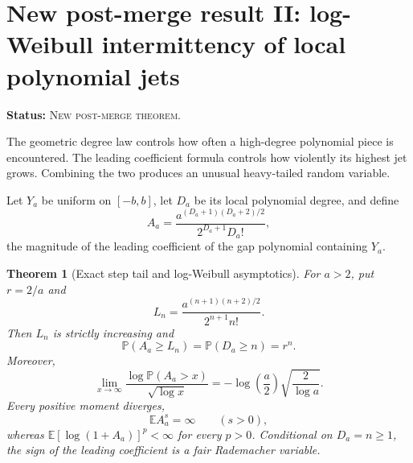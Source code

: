 \documentclass[11pt,oneside]{article}
\newtheorem{theorem}{Theorem}[section]
\theoremstyle{definition}
\theoremstyle{remark}
\newcommand{\E}{\mathbb{E}}
\newcommand{\Prob}{\mathbb{P}}
\newcommand{\DerivedStatus}{\textcolor{DerivedPurple}{\textsc{New post-merge theorem}}}
\newcommand{\status}[1]{\par\smallskip\noindent\textbf{Status:} #1.\par\smallskip}
\begin{document}
\section{New post-merge result II: log-Weibull intermittency of local polynomial jets}
\label{sec:jet-intermittency}
\status{\DerivedStatus}

The geometric degree law controls how often a high-degree polynomial piece is encountered.
The leading coefficient formula controls how violently its highest jet grows.  Combining the
two produces an unusual heavy-tailed random variable.

Let \(Y_a\) be uniform on \([-b,b]\), let \(D_a\) be its local polynomial degree, and define
\begin{equation}
 A_a=\frac{a^{(D_a+1)(D_a+2)/2}}{2^{D_a+1}D_a!},
 \label{eq:random-leading-amplitude}
\end{equation}
the magnitude of the leading coefficient of the gap polynomial containing \(Y_a\).

\begin{theorem}[Exact step tail and log-Weibull asymptotics]
\label{thm:jet-heavy-tail}
For \(a>2\), put \(r=2/a\) and
\[
 L_n=\frac{a^{(n+1)(n+2)/2}}{2^{n+1}n!}.
\]
Then \(L_n\) is strictly increasing and
\begin{equation}
  \Prob(A_a\ge L_n)=\Prob(D_a\ge n)=r^n.
  \label{eq:jet-exact-tail}
\end{equation}
Moreover,
\begin{equation}
 \lim_{x\to\infty}
 \frac{\log\Prob(A_a>x)}{\sqrt{\log x}}
 =-\log\!\left(\frac a2\right)\sqrt{\frac{2}{\log a}}.
 \label{eq:jet-log-weibull-tail}
\end{equation}
Every positive moment diverges,
\begin{equation}
  \E A_a^s=\infty\qquad(s>0),
  \label{eq:jet-infinite-moments}
\end{equation}
whereas \(\E[\log(1+A_a)]^p<\infty\) for every \(p>0\).  Conditional on \(D_a=n\ge1\),
the sign of the leading coefficient is a fair Rademacher variable.
\end{theorem}
\end{document}
